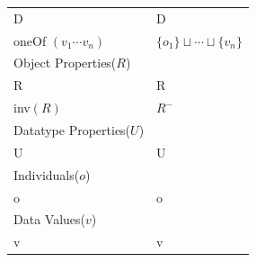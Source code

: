 \begin{table}[ht]
\begin{tabular}{|p{10cm}|p{5cm}|}
			\hline
			D & D\\
			oneOf $(v_{1} \cdots v_{n})$ & $\{o_{1}\} \sqcup \cdots \sqcup \{v_{n}\}$\\
			\hline
			Object Properties($R$) & {}\\
			\hline
			R & R\\
			inv$(R)$ & $R^{-}$\\
			\hline
			\hline
			Datatype Properties($U$) & {}\\
			\hline
			U & U\\
			\hline
			\hline
			Individuals($o$) & {}\\
			\hline
			o & o\\
			\hline
			\hline
			Data Values($v$) & {}\\
			\hline
			v & v\\
			\hline
		\end{tabular}
\label{tab:OWLvsDL}
\end{table}
